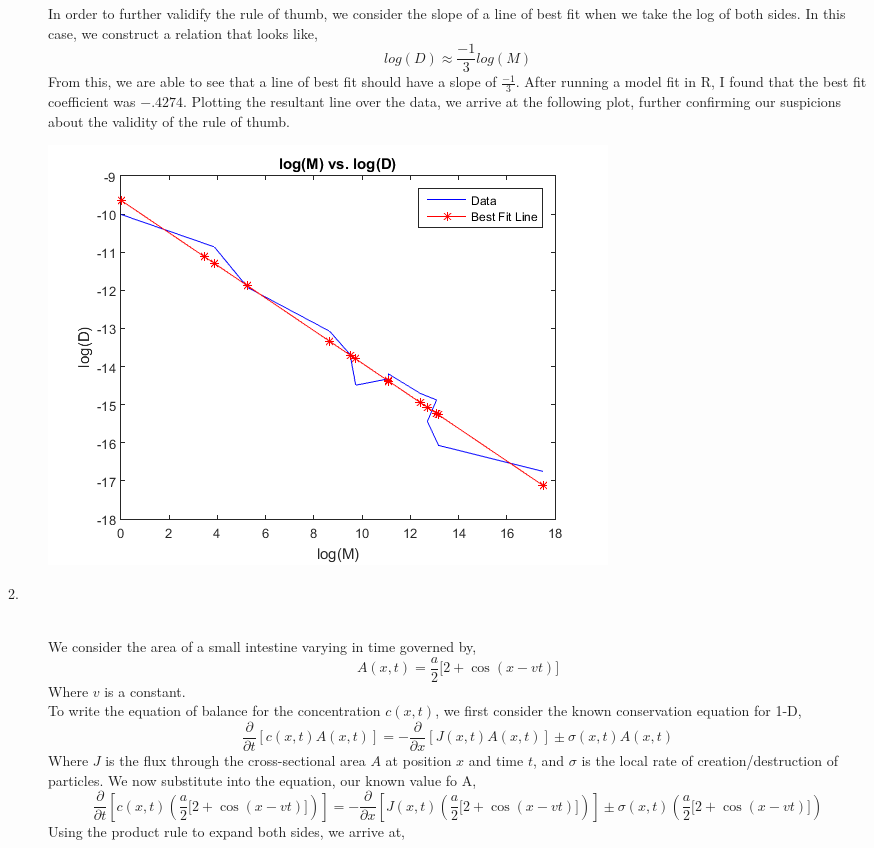\documentclass[letterpaper,10pt]{article}
\begin{document}
\begin{description}
\begin{center}
\end{center}
In order to further validify the rule of thumb, we consider the slope of a line of best fit when we take the log of both sides. In this case, we construct a relation that looks like,
\[log(D)\approx \frac{-1}{3}log(M)\]
From this, we are able to see that a line of best fit should have a slope of $\frac{-1}{3}$. After running a model fit in R, I found that the best fit coefficient was $-.4274$. Plotting the resultant line over the data, we arrive at the following plot, further confirming our suspicions about the validity of the rule of thumb.
\begin{center}
\includegraphics{best.png}
\end{center}
\item[2.] \hfill \\
We consider the area of a small intestine varying in time governed by,
\[A(x,t)=\frac{a}{2}\big[2+\cos(x-vt)\big]\]
Where $v$ is a constant.\\
To write the equation of balance for the concentration $c(x,t)$, we first consider the known conservation equation for 1-D,
\[\frac{\partial}{\partial t}[c(x,t)A(x,t)]=-\frac{\partial}{\partial x}[J(x,t)A(x,t)]\pm \sigma(x,t)A(x,t)\]
Where $J$ is the flux through the cross-sectional area $A$ at position $x$ and time $t$, and $\sigma$ is the local rate of creation/destruction of particles.
We now substitute into the equation, our known value fo A,
\[\frac{\partial}{\partial t}[c(x,t)(\frac{a}{2}\big[2+\cos(x-vt)\big])]=-\frac{\partial}{\partial x}[J(x,t)(\frac{a}{2}\big[2+\cos(x-vt)\big])]\pm \sigma(x,t)(\frac{a}{2}\big[2+\cos(x-vt)\big])\]
Using the product rule to expand both sides, we arrive at,

\end{description}
\end{document}
